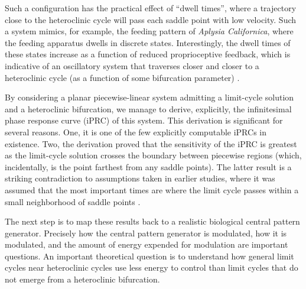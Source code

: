\documentclass[a4paper,11pt]{article}
\begin{document}
Such a configuration has the practical effect of ``dwell times'', where a trajectory close to the heteroclinic cycle will pass each saddle point with low velocity. Such a system mimics, for example, the feeding pattern of \textit{Aplysia Californica}, where the feeding apparatus dwells in discrete states. Interestingly, the dwell times of these states increase as a function of reduced proprioceptive feedback, which is indicative of an oscillatory system that traverses closer and closer to a heteroclinic cycle (as a function of some bifurcation parameter) \cite{shaw2010evidence}.

By considering a planar piecewise-linear system admitting a limit-cycle solution and a heteroclinic bifurcation, we manage to derive, explicitly, the infinitesimal phase response curve (iPRC) of this system. This derivation is significant for several reasons. One, it is one of the few explicitly computable iPRCs in existence. Two, the derivation proved that the sensitivity of the iPRC is greatest as the limit-cycle solution crosses the boundary between piecewise regions (which, incidentally, is the point farthest from any saddle points). The latter result is a striking contradiction to assumptions taken in earlier studies, where it was assumed that the most important times are where the limit cycle passes within a small neighborhood of saddle points \cite{brown2004phase}.

The next step is to map these results back to a realistic biological central pattern generator. Precisely how the central pattern generator is modulated, how it is modulated, and the amount of energy expended for modulation are important questions. An important theoretical question is to understand how general limit cycles near heteroclinic cycles use less energy to control than limit cycles that do not emerge from a heteroclinic bifurcation.

\end{document}
